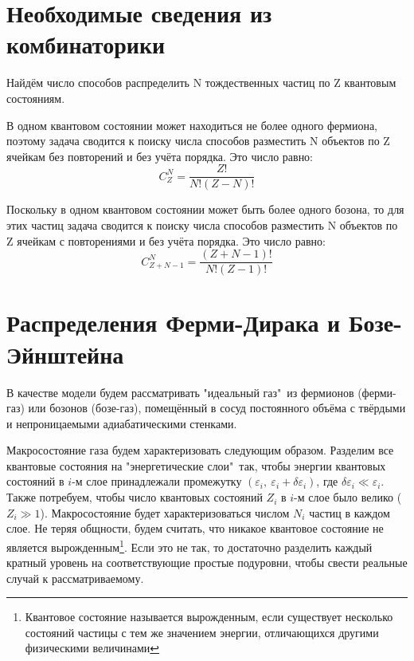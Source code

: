 \documentclass[A4]{article}
\begin{document}
\section{Необходимые сведения из комбинаторики}

    Найдём число способов распределить N тождественных частиц по Z квантовым состояниям.

    В одном квантовом состоянии может находиться не более одного фермиона, поэтому задача сводится к поиску
    числа способов разместить N объектов по Z ячейкам без повторений и без учёта порядка. Это число равно:
    \begin{equation*}
        C_Z^N = \frac{Z!}{N!(Z - N)!}
    \end{equation*}

    Поскольку в одном квантовом состоянии может быть более одного бозона, то для этих частиц задача сводится
    к поиску числа способов разместить N объектов по Z ячейкам с повторениями и без учёта порядка. Это число
    равно:
    \begin{equation*}
        C_{Z + N - 1}^N = \frac{(Z + N - 1)!}{N!(Z - 1)!}
    \end{equation*}

\section{Распределения Ферми-Дирака и Бозе-Эйнштейна}

    В качестве модели будем рассматривать "идеальный газ"\ из фермионов (ферми-газ) или бозонов (бозе-газ),
    помещённый в сосуд постоянного объёма с твёрдыми и непроницаемыми адиабатическими стенками.

    Макросостояние газа будем характеризовать следующим образом. Разделим все квантовые состояния на
    "энергетические слои"\ так, чтобы энергии квантовых состояний в $i$-м слое принадлежали промежутку
    $(\varepsilon_i,\ \varepsilon_i + \delta\varepsilon_i)$, где $\delta\varepsilon_i \ll \varepsilon_i$.
    Также потребуем, чтобы число квантовых состояний $Z_i$ в $i$-м слое было велико ($Z_i \gg 1$).
    Макросостояние будет характеризоваться числом $N_i$ частиц в каждом слое. Не теряя общности, будем
    считать, что никакое квантовое состояние не является вырожденным\footnote{Квантовое состояние
    называется вырожденным, если существует несколько состояний частицы с тем же значением энергии,
    отличающихся другими физическими величинами}. Если это не так, то достаточно разделить каждый
    кратный уровень на соответствующие простые подуровни, чтобы свести реальные случай к рассматриваемому.
\end{document}
